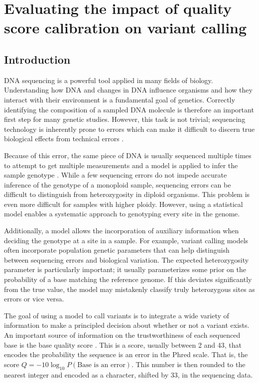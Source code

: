 \chapter{Evaluating the impact of quality score calibration on variant calling}
\label{ch:evaluating}
\section{Introduction}

DNA sequencing is a powerful tool applied in many fields of biology. Understanding how DNA and changes in DNA influence organisms and how they interact with their environment is a fundamental goal of genetics. Correctly identifying the composition of a sampled DNA molecule is therefore an important first step for many genetic studies. However, this task is not trivial; sequencing technology is inherently prone to errors which can make it difficult to discern true biological effects from technical errors \parencite{fox_accuracy_2014, wu_estimating_2017}. 

Because of this error, the same piece of DNA is usually sequenced multiple times to attempt to get multiple measurements and a model is applied to infer the sample genotype \parencite{li_statistical_2011, garrison_haplotype-based_2012, poplin_scaling_2018}. While a few sequencing errors do not impede accurate inference of the genotype of a monoploid sample, sequencing errors can be difficult to distinguish from heterozygosity in diploid organisms. This problem is even more difficult for samples with higher ploidy. However, using a statistical model enables a systematic approach to genotyping every site in the genome.

Additionally, a model allows the incorporation of auxiliary information when deciding the genotype at a site in a sample. For example, variant calling models often incorporate population genetic parameters that can help distinguish between sequencing errors and biological variation. The expected heterozygosity parameter \theta{} is particularly important; it usually parameterizes some prior on the probability of a base matching the reference genome. If this deviates significantly from the true value, the model may mistakenly classify truly heterozygous sites as errors or vice versa.

The goal of using a model to call variants is to integrate a wide variety of information to make a principled decision about whether or not a variant exists. An important source of information on the trustworthiness of each sequenced base is the base quality score \parencite{ewing_base-calling_1998, ewing_base-calling_1998-1}. This is a score, usually between 2 and 43, that encodes the probability the sequence is an error in the Phred scale. That is, the score $Q = -10\log_{10}P(\text{Base is an error})$. This number is then rounded to the nearest integer and encoded as a character, shifted by 33, in the sequencing data.

